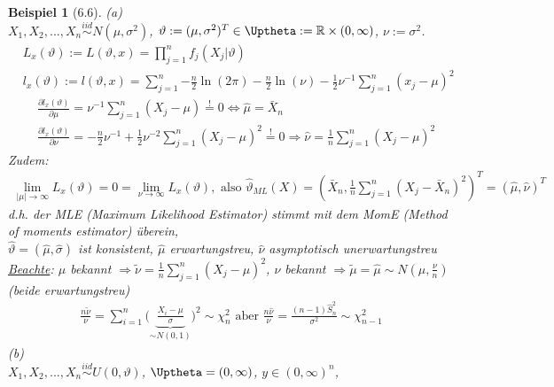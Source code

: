 \documentclass[a4paper,openany]{book}
\theoremstyle{mytheoremstyle}
\newtheorem*{bei}{Beispiel}
\theoremstyle{mytheoremstyle2}
\begin{document}
\begin{bei}[6.6]
  (a)\\
  $X_1,X_2,...,X_n \overset{iid}\sim N(\mu ,\sigma ^2)$, $\vartheta :=(\mu ,\sigma ^2)^T \in \Uptheta:=\mathbb{R}\times (0,\infty )$, $\nu :=\sigma ^2$. 
  \begin{align*}
    &L_x(\vartheta ):=L(\vartheta ,x)=\prod_{j=1}^{n}{f_j(X_j|\vartheta )}\\
    &l_x(\vartheta ):=l(\vartheta ,x)=\sum_{j=1}^{n}{-\frac{n}{2}\ln(2 \pi )-\frac{n}{2}\ln(\nu )-\frac{1}{2}\nu ^{-1}}\sum_{j=1}^{n}{(x_j-\mu )^2}
  \end{align*}
  \begin{align*}
    &\frac{\partial l_x(\vartheta ) }{\partial \mu }=\nu ^{-1}\sum_{j=1}^{n}{(X_j-\mu )}\overset{!}=0 \Leftrightarrow \hat{\mu} =\bar{X}_n \\
    &\frac{\partial l_x(\vartheta)}{\partial \nu }=-\frac{n}{2}\nu ^{-1}+\frac{1}{2}\nu ^{-2}\sum_{j=1}^{n}{(X_j-\mu )^2}\overset{!}=0 \Rightarrow \hat{\nu} =\frac{1}{n}\sum_{j=1}^{n}{(X_j-\mu )^2}
  \end{align*}
  Zudem:
  \begin{align*}
    \lim_{|\mu |\to \infty }{L_x(\vartheta )}=0=\lim_{\nu \to \infty }{L_x(\vartheta )},\text{ also }\hat{\vartheta }_{ML}(X)=\left(\bar{X}_n,\frac{1}{n}\sum_{j=1}^{n}{(X_j-\bar{X}_n)^2}\right)^T=(\hat{\mu },\hat{\nu })^T
  \end{align*}
  d.h. der MLE (Maximum Likelihood Estimator) stimmt mit dem MomE (Method of moments estimator) überein,\\
  $\hat{\vartheta }=(\hat{\mu },\hat{\sigma })$ ist konsistent, $\hat{\mu }$ erwartungstreu, $\hat{\nu }$ asymptotisch unerwartungstreu \\
  \underline{Beachte}: $\mu $ bekannt $\Rightarrow \tilde{\nu }=\frac{1}{n}\sum_{j=1}^{n}{(X_j-\mu )^2}$, $\nu $ bekannt $\Rightarrow \tilde{\mu }=\hat{\mu }\sim N(\mu ,\frac{\nu }{n})$ (beide erwartungstreu)
  \begin{align*}
    \frac{n \tilde{\nu }}{\nu }=\sum_{i=1}^{n}{\bigg(\underbrace{\frac{X_i-\mu }{\sigma }}_{\sim N(0,1)}\bigg)^2}\sim \chi _n^2 \text{ \ aber  \ }\frac{n \hat{\nu }}{\nu }=\frac{(n-1)\hat{S}_n^2}{\sigma ^2}\sim \chi _{n-1}^2
  \end{align*}
  (b)\\
  $X_1,X_2,...,X_n \overset{iid}\sim U(0,\vartheta )$, $\Uptheta=(0,\infty )$, $y \in (0,\infty )^n$,

\end{bei}
\end{document}
